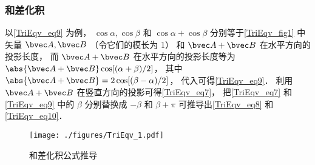 \subsubsection{和差化积}
以\autoref{TriEqv_eq9} 为例， $\cos \alpha, \cos \beta$ 和 $\cos \alpha + \cos \beta$ 分别等于\autoref{TriEqv_fig1} 中矢量 $\bvec A, \bvec B$ （令它们的模长为 1） 和 $\bvec A + \bvec B$ 在水平方向的投影长度， 而 $\bvec A + \bvec B$ 在水平方向的投影长度等为 $\abs{\bvec A + \bvec B}\cos[(\alpha+\beta)/2]$， 其中 $\abs{\bvec A + \bvec B} = 2\cos [(\beta-\alpha)/2]$， 代入可得\autoref{TriEqv_eq9}． 利用 $\bvec A + \bvec B$ 在竖直方向的投影可得\autoref{TriEqv_eq7}， 把\autoref{TriEqv_eq7} 和\autoref{TriEqv_eq9} 中的 $\beta$ 分别替换成 $-\beta$ 和 $\beta+\pi$ 可推导出\autoref{TriEqv_eq8} 和\autoref{TriEqv_eq10}．
\begin{figure}[ht]
\centering
\texttt{[image: ./figures/TriEqv\_1.pdf]}
\caption{和差化积公式推导} \label{TriEqv_fig1}
\end{figure}
